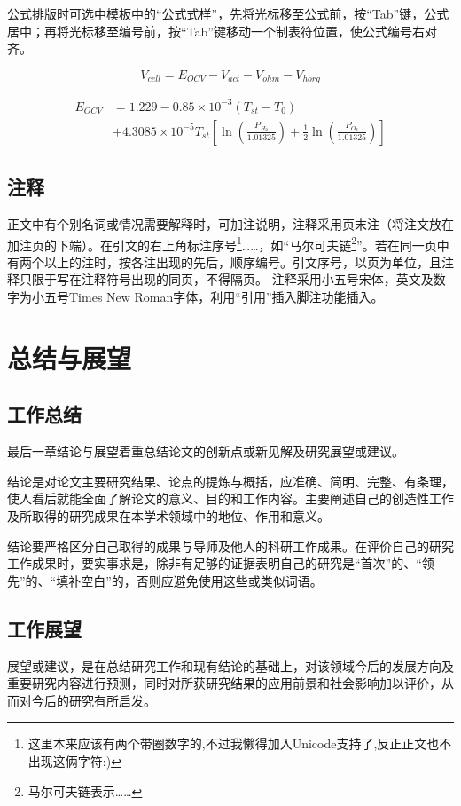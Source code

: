 \begin{spacing}{1.5}
    公式排版时可选中模板中的“公式式样”，先将光标移至公式前，按“Tab”键，公式居中；再将光标移至编号前，按“Tab”键移动一个制表符位置，使公式编号右对齐。
    
    \begin{equation}
        V_{cell} = E_{OCV} - V_{act}- V_{ohm}- V_{horg}    
    \end{equation}
    
    \begin{equation}
        \begin{aligned}
            E_{OCV} &= 1.229-0.85\times 10^{-3}(T_{st}-T_0)\\
                    &+4.3085\times 10^{-5}T_{st}\left[\ln(\frac{P_{H_2}}{1.01325})+\frac{1}{2}\ln(\frac{P_{O_2}}{1.01325})\right]
        \end{aligned}
    \end{equation}
    
    \subsection{注释}
    
    正文中有个别名词或情况需要解释时，可加注说明，注释采用页末注（将注文放在加注页的下端）。在引文的右上角标注序号\footnote{这里本来应该有两个带圈数字的,不过我懒得加入Unicode支持了,反正正文也不出现这俩字符:)}……，如“马尔可夫链\footnote{ 马尔可夫链表示……}”。若在同一页中有两个以上的注时，按各注出现的先后，顺序编号。引文序号，以页为单位，且注释只限于写在注释符号出现的同页，不得隔页。
    注释采用小五号宋体，英文及数字为小五号Times New Roman字体，利用“引用”插入脚注功能插入。
    
    \newpage
    \section{总结与展望}
    
    \subsection{工作总结}
    最后一章结论与展望着重总结论文的创新点或新见解及研究展望或建议。
    
    结论是对论文主要研究结果、论点的提炼与概括，应准确、简明、完整、有条理，使人看后就能全面了解论文的意义、目的和工作内容。主要阐述自己的创造性工作及所取得的研究成果在本学术领域中的地位、作用和意义。
    
    结论要严格区分自己取得的成果与导师及他人的科研工作成果。在评价自己的研究工作成果时，要实事求是，除非有足够的证据表明自己的研究是“首次”的、“领先”的、“填补空白”的，否则应避免使用这些或类似词语。
    
    \subsection{工作展望}
    
    展望或建议，是在总结研究工作和现有结论的基础上，对该领域今后的发展方向及重要研究内容进行预测，同时对所获研究结果的应用前景和社会影响加以评价，从而对今后的研究有所启发。
        
\end{spacing}
